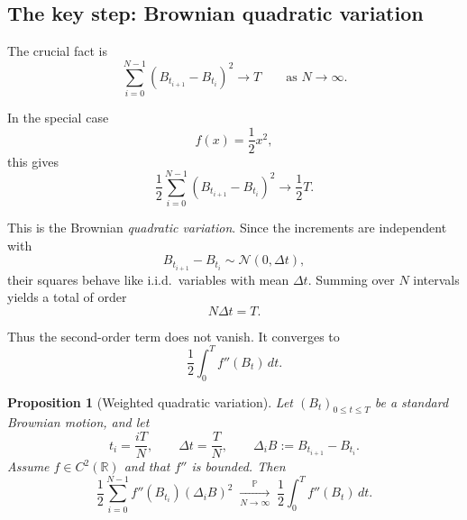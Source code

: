 \documentclass[11pt]{article}
\newtheorem{proposition}[theorem]{Proposition}
\theoremstyle{definition}
\begin{document}
\subsection{The key step: Brownian quadratic variation}

The crucial fact is
\[
\sum_{i=0}^{N-1}(B_{t_{i+1}}-B_{t_i})^2 \to T
\qquad \text{as } N\to\infty.
\]

In the special case
\[
f(x)=\frac12 x^2,
\]
this gives
\[
\frac12\sum_{i=0}^{N-1}(B_{t_{i+1}}-B_{t_i})^2\to \frac12 T.
\]

This is the Brownian \emph{quadratic variation}. Since the increments are independent with
\[
B_{t_{i+1}}-B_{t_i}\sim \mathcal N(0,\Delta t),
\]
their squares behave like i.i.d.\ variables with mean \(\Delta t\). Summing over \(N\) intervals yields a total of order
\[
N\Delta t=T.
\]

Thus the second-order term does not vanish. It converges to
\[
\frac12\int_0^T f''(B_t)\,dt.
\]

\begin{proposition}[Weighted quadratic variation]
Let \((B_t)_{0\le t\le T}\) be a standard Brownian motion, and let
\[
t_i=\frac{iT}{N},\qquad \Delta t=\frac{T}{N},\qquad \Delta_i B:=B_{t_{i+1}}-B_{t_i}.
\]
Assume \(f\in C^2(\mathbb R)\) and that \(f''\) is bounded. Then
\[
\frac12\sum_{i=0}^{N-1} f''(B_{t_i})(\Delta_i B)^2
\;\xrightarrow[N\to\infty]{\mathbb P}\;
\frac12\int_0^T f''(B_t)\,dt.
\]
\end{proposition}
\end{document}
